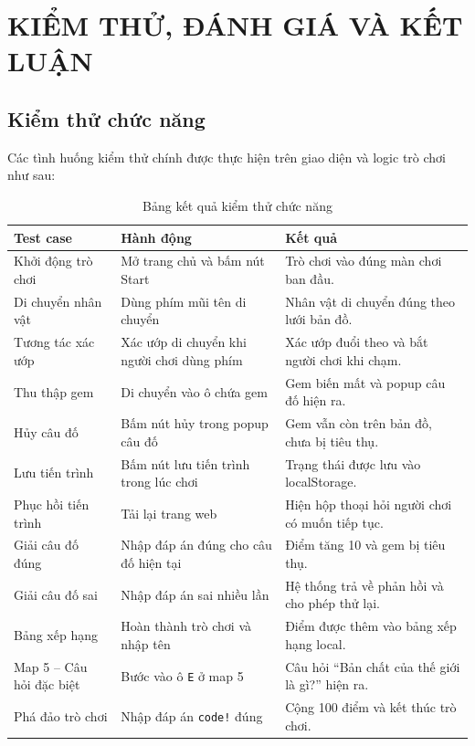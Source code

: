 \chapter{KIỂM THỬ, ĐÁNH GIÁ VÀ KẾT LUẬN}

\section{Kiểm thử chức năng}

Các tình huống kiểm thử chính được thực hiện trên giao diện và logic trò chơi như sau:

\begin{table}[H]
\centering
\caption{Bảng kết quả kiểm thử chức năng}
\label{tab:kiem-thu-chuc-nang}
\begin{tabular}{|p{4cm}|p{5cm}|p{4cm}|}
\hline
\textbf{Test case} & \textbf{Hành động} & \textbf{Kết quả} \\ \hline
Khởi động trò chơi & Mở trang chủ và bấm nút Start & Trò chơi vào đúng màn chơi ban đầu. \\ \hline
Di chuyển nhân vật & Dùng phím mũi tên di chuyển & Nhân vật di chuyển đúng theo lưới bản đồ. \\ \hline
Tương tác xác ướp & Xác ướp di chuyển khi người chơi dùng phím & Xác ướp đuổi theo và bắt người chơi khi chạm. \\ \hline
Thu thập gem & Di chuyển vào ô chứa gem & Gem biến mất và popup câu đố hiện ra. \\ \hline
Hủy câu đố & Bấm nút hủy trong popup câu đố & Gem vẫn còn trên bản đồ, chưa bị tiêu thụ. \\ \hline
Lưu tiến trình & Bấm nút lưu tiến trình trong lúc chơi & Trạng thái được lưu vào localStorage. \\ \hline
Phục hồi tiến trình & Tải lại trang web & Hiện hộp thoại hỏi người chơi có muốn tiếp tục. \\ \hline
Giải câu đố đúng & Nhập đáp án đúng cho câu đố hiện tại & Điểm tăng 10 và gem bị tiêu thụ. \\ \hline
Giải câu đố sai & Nhập đáp án sai nhiều lần & Hệ thống trả về phản hồi và cho phép thử lại. \\ \hline
Bảng xếp hạng & Hoàn thành trò chơi và nhập tên & Điểm được thêm vào bảng xếp hạng local. \\ \hline
Map 5 -- Câu hỏi đặc biệt & Bước vào ô \texttt{E} ở map 5 & Câu hỏi ``Bản chất của thế giới là gì?'' hiện ra. \\ \hline
Phá đảo trò chơi & Nhập đáp án \texttt{code!} đúng & Cộng 100 điểm và kết thúc trò chơi. \\ \hline
\end{tabular}
\end{table}

